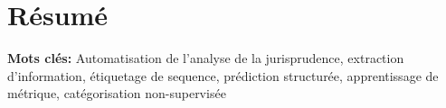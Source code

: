 \chapter*{Résumé}


\textbf{Mots clés:} Automatisation de l'analyse de la jurisprudence, extraction d'information, étiquetage de sequence, prédiction structurée, apprentissage de métrique, catégorisation non-supervisée
